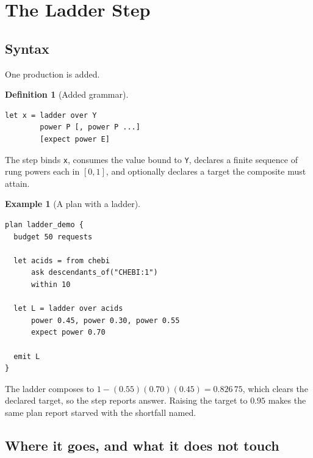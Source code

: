 \documentclass[11pt,twocolumn,a4paper]{article}
\theoremstyle{plain}
\theoremstyle{definition}
\newtheorem{definition}[theorem]{Definition}
\newtheorem{example}[theorem]{Example}
\theoremstyle{remark}
\newcommand{\vans}{\textsf{answer}}
\newcommand{\vstarve}{\textsf{starved}}
\newcommand{\hfq}[1]{\texttt{#1}}
\begin{document}
\section{The Ladder Step}
\label{sec:where}

\subsection{Syntax}

One production is added.

\begin{definition}[Added grammar]
\label{def:grammar}
\begin{lstlisting}
let x = ladder over Y
        power P [, power P ...]
        [expect power E]
\end{lstlisting}
The step binds \hfq{x}, consumes the value bound to \hfq{Y}, declares a finite
sequence of rung powers each in $[0,1]$, and optionally declares a target the
composite must attain.
\end{definition}

\begin{example}[A plan with a ladder]
\label{ex:plan}
\begin{lstlisting}
plan ladder_demo {
  budget 50 requests

  let acids = from chebi
      ask descendants_of("CHEBI:1")
      within 10

  let L = ladder over acids
      power 0.45, power 0.30, power 0.55
      expect power 0.70

  emit L
}
\end{lstlisting}
The ladder composes to $1-(0.55)(0.70)(0.45)=0.826\,75$, which clears the
declared target, so the step reports \vans. Raising the target to $0.95$ makes
the same plan report \vstarve{} with the shortfall named.
\end{example}

\subsection{Where it goes, and what it does not touch}
\end{document}
